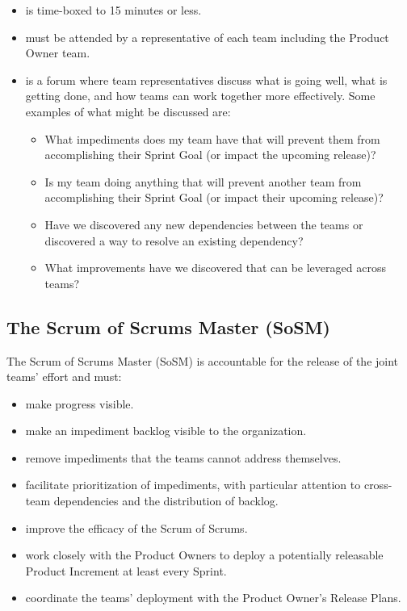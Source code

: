 \documentclass[12pt,a4paper,parskip=full]{scrartcl}
\begin{document}
\begin{itemize}
\item is time-boxed to 15 minutes or less.
\item must be attended by a representative of each team including the Product Owner team.
\item is a forum where team representatives discuss what is going well, what is getting done, and how teams can work together more effectively. Some examples of what might be discussed are:
\begin{itemize}
\item What impediments does my team have that will prevent them from
accomplishing their Sprint Goal (or impact the upcoming release)?
\item Is my team doing anything that will prevent another team from
accomplishing their Sprint Goal (or impact their upcoming release)?
\item Have we discovered any new dependencies between the teams or
discovered a way to resolve an existing dependency?
\item What improvements have we discovered that can be leveraged across teams?
\end{itemize}
\end{itemize}

\subsection{The Scrum of Scrums Master (SoSM)}
The Scrum of Scrums Master (SoSM) is accountable for the release of the
joint teams' effort and must:
\begin{itemize}
\item make progress visible.
\item make an impediment backlog visible to the organization.
\item remove impediments that the teams cannot address themselves.
\item facilitate prioritization of impediments, with particular attention to cross-team
dependencies and the distribution of backlog.
\item improve the efficacy of the Scrum of Scrums.
\item work closely with the Product Owners to deploy a potentially
releasable Product Increment at least every Sprint.
\item coordinate the teams' deployment with the Product Owner's Release
Plans.
\end{itemize}
\end{document}
